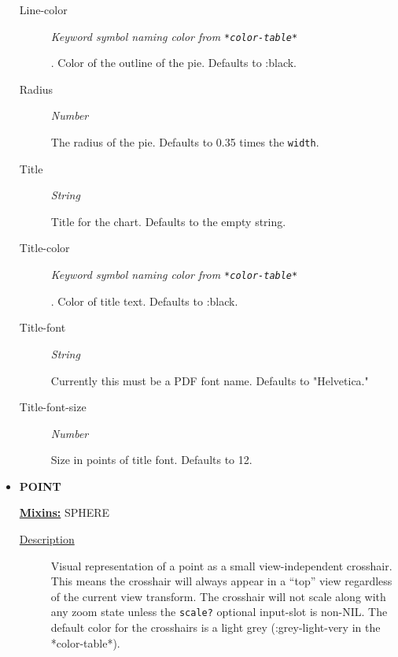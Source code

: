 \documentclass [11pt]{book}
\begin{document}
\begin{itemize}
\begin{description}
\item [Line-color]
\emph{Keyword symbol naming color from \texttt{*color-table*}}

.
Color of the outline of the pie. Defaults to :black.




\item [Radius]
\emph{Number}

 The radius of the pie. Defaults to 0.35 times the \texttt{width}.




\item [Title]
\emph{String}

 Title for the chart. Defaults to the empty string.




\item [Title-color]
\emph{Keyword symbol naming color from \texttt{*color-table*}}

.
Color of title text. Defaults to :black.




\item [Title-font]
\emph{String}

 Currently this must be a PDF font name. Defaults to "Helvetica."




\item [Title-font-size]
\emph{Number}

 Size in points of title font. Defaults to 12.




\end{description}







\item {}
\label{prim:point}
\textbf{POINT}


\textbf{
\underline{Mixins:}} SPHERE





\begin{description}

\item [
\underline{Description}]


Visual representation of a point as a small view-independent crosshair. This means
the crosshair will always appear in a ``top'' view regardless of the current view transform. The crosshair will
not scale along with any zoom state unless the \texttt{scale?} optional input-slot is non-NIL. The default
color for the crosshairs is a light grey (:grey-light-very in the *color-table*).




\end{description}
\end{itemize}
\end{document}
